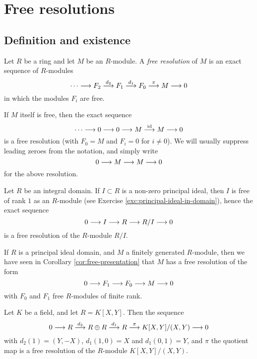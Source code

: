 
\chapter{Free resolutions}

\section{Definition and existence}




\begin{definition}
Let $R$ be a ring and let $M$ be an $R$-module. A \emph{free resolution} of $M$ is an exact sequence
of $R$-modules
\[
	\cdots \longrightarrow F_2 \overset{d_2}{\longrightarrow} F_1 \overset{d_1}{\longrightarrow} F_0 \overset{\pi}{\longrightarrow} M \longrightarrow 0 
\]
in which the modules $F_i$ are free.
\end{definition}

\begin{example}
If $M$ itself is free, then the exact sequence
\[
	\cdots \longrightarrow 0 \longrightarrow 0 \longrightarrow M \overset{{\rm id}}{\longrightarrow} M \longrightarrow 0
\]
is a free resolution (with $F_0=M$ and $F_i=0$ for $i\neq 0$). We will usually suppress leading zeroes from the notation, and simply write 
\[
	0 \longrightarrow M \longrightarrow M \longrightarrow 0
\]
for the above resolution.
\end{example}

\begin{example}Let $R$ be an integral domain. 
If $I \subset R$ is a non-zero principal ideal, then $I$ is free of rank $1$ as an $R$-module (see Exercise \ref{exc:principal-ideal-in-domain}), hence the exact sequence
\[
	0 \longrightarrow I \longrightarrow R \longrightarrow R/I \longrightarrow 0
\]
is a free resolution of the $R$-module $R/I$.
\end{example}

\begin{example}
If $R$ is a principal ideal domain, and $M$ a finitely generated $R$-module, then we have seen in
Corollary \ref{cor:free-presentation} that $M$ has a free resolution of the form
\[
	0 \longrightarrow F_1 \longrightarrow F_0 \longrightarrow M \longrightarrow 0
\]
with $F_0$ and $F_1$ free $R$-modules of finite rank.
\end{example}

\begin{example}
Let $K$ be a field, and let $R=K[X,Y]$. Then the sequence
\[
	0 \longrightarrow R  \overset{d_2}{\longrightarrow} R \oplus R
	\overset{d_1}{\longrightarrow} R \overset{\pi}{\longrightarrow} K[X,Y]/(X,Y) \longrightarrow 0 
\]
with $d_2(1) = (Y,-X)$, $d_1(1,0) = X$ and $d_1(0,1)=Y$, and $\pi$ the quotient map is a free resolution of the $R$-module $K[X,Y]/(X,Y)$.
\end{example}

